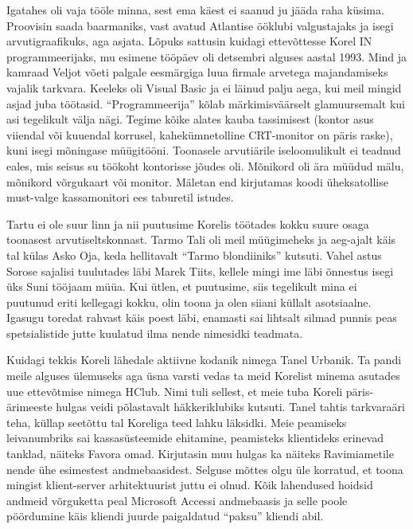 Igatahes oli vaja tööle minna, sest ema käest ei saanud ju jääda raha küsima. 
Proovisin saada baarmaniks, vast avatud Atlantise ööklubi valgustajaks ja isegi 
arvutigraafikuks, aga asjata. Lõpuks sattusin kuidagi ettevõttesse Korel 
IN programmeerijaks, mu esimene tööpäev oli detsembri alguses 
aastal 1993. Mind ja kamraad Veljot võeti palgale 
eesmärgiga luua firmale arvetega majandamiseks vajalik tarkvara. Keeleks oli 
Visual Basic ja ei läinud palju aega, kui meil mingid asjad 
juba töötasid. \enquote{Programmeerija} kõlab märkimisväärselt glamuursemalt 
kui asi tegelikult välja nägi. Tegime kõike alates kauba tassimisest (kontor 
asus viiendal või kuuendal korrusel, kahekümnetolline CRT-monitor on päris 
raske), kuni isegi mõningase müügitööni. Toonasele arvutiärile iseloomulikult 
ei teadnud eales, mis seisus su töökoht kontorisse jõudes oli. Mõnikord oli ära 
müüdud mälu, mõnikord võrgukaart või monitor. Mäletan end kirjutamas koodi 
üheksatollise must-valge kassamonitori ees taburetil istudes. 

Tartu ei ole suur linn ja nii puutusime Korelis töötades kokku suure osaga 
toonasest arvutiseltskonnast. Tarmo Tali oli meil 
müügimeheks ja aeg-ajalt käis tal külas Asko Oja, keda 
hellitavalt \enquote{Tarmo blondiiniks} kutsuti. Vahel astus Sorose sajalisi 
tuulutades läbi Marek Tiits, kellele mingi ime läbi 
õnnestus isegi üks Suni tööjaam müüa. Kui ütlen, et puutusime, siis tegelikult 
mina ei puutunud eriti kellegagi kokku, olin toona ja olen siiani küllalt 
asotsiaalne. Igasugu toredat rahvast käis poest läbi, enamasti sai lihtsalt 
silmad punnis peas spetsialistide jutte kuulatud ilma nende nimesidki teadmata. 

Kuidagi tekkis Koreli lähedale aktiivne kodanik nimega Tanel 
Urbanik. Ta pandi meile alguses ülemuseks aga üsna 
varsti vedas ta meid Korelist minema asutades uue ettevõtmise nimega HClub. 
Nimi tuli sellest, et meie tuba Koreli päris-ärimeeste hulgas veidi põlastavalt 
häkkeriklubiks kutsuti. Tanel tahtis tarkvaraäri teha, küllap seetõttu tal 
Koreliga teed lahku läksidki. Meie peamiseks leivanumbriks sai kassasüsteemide 
ehitamine, peamisteks klientideks erinevad tanklad, näiteks Favora omad. 
Kirjutasin muu hulgas ka näiteks Ravimiametile nende ühe 
esimestest andmebaasidest. Selguse mõttes olgu üle korratud, et toona mingist 
klient-server arhitektuurist juttu ei olnud. Kõik lahendused hoidsid andmeid 
võrguketta peal Microsoft Accessi andmebaasis ja selle 
poole pöördumine käis kliendi juurde paigaldatud \enquote{paksu} kliendi abil. 

